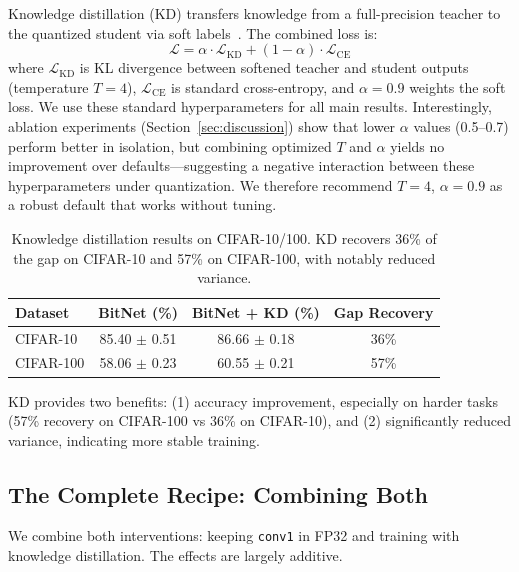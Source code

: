 \documentclass[10pt]{article}
\begin{document}
Knowledge distillation (KD) transfers knowledge from a full-precision teacher to the quantized student via soft labels~\cite{hinton2015distilling}. The combined loss is:
\begin{equation}
    \mathcal{L} = \alpha \cdot \mathcal{L}_{\text{KD}} + (1 - \alpha) \cdot \mathcal{L}_{\text{CE}}
\end{equation}
where $\mathcal{L}_{\text{KD}}$ is KL divergence between softened teacher and student outputs (temperature $T=4$), $\mathcal{L}_{\text{CE}}$ is standard cross-entropy, and $\alpha=0.9$ weights the soft loss. We use these standard hyperparameters for all main results. Interestingly, ablation experiments (Section~\ref{sec:discussion}) show that lower $\alpha$ values (0.5--0.7) perform better in isolation, but combining optimized $T$ and $\alpha$ yields no improvement over defaults---suggesting a negative interaction between these hyperparameters under quantization. We therefore recommend $T=4$, $\alpha=0.9$ as a robust default that works without tuning.

\begin{table}[ht]
\centering
\caption{Knowledge distillation results on CIFAR-10/100. KD recovers 36\% of the gap on CIFAR-10 and 57\% on CIFAR-100, with notably reduced variance.}
\label{tab:kd}
\begin{tabular}{lccc}
\toprule
Dataset & BitNet (\%) & BitNet + KD (\%) & Gap Recovery \\
\midrule
CIFAR-10  & 85.40 $\pm$ 0.51 & 86.66 $\pm$ 0.18 & 36\% \\
CIFAR-100 & 58.06 $\pm$ 0.23 & 60.55 $\pm$ 0.21 & 57\% \\
\bottomrule
\end{tabular}
\end{table}

KD provides two benefits: (1) accuracy improvement, especially on harder tasks (57\% recovery on CIFAR-100 vs 36\% on CIFAR-10), and (2) significantly reduced variance, indicating more stable training.

\subsection{The Complete Recipe: Combining Both}

We combine both interventions: keeping \texttt{conv1} in FP32 and training with knowledge distillation. The effects are largely additive.
\end{document}
